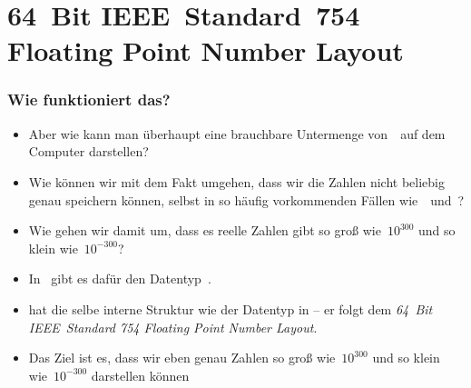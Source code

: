 \documentclass[aspectratio=169,mathserif,notheorems]{beamer}%
\begin{document}
\section{64~Bit IEEE~Standard~754 Floating Point Number Layout}%
%
\begin{frame}%
\frametitle{Wie funktioniert das?}%
\begin{itemize}%
\item Aber wie kann man überhaupt eine brauchbare Untermenge von~\realNumbers\ auf dem Computer darstellen?%
\item<2-> Wie können wir mit dem Fakt umgehen, dass wir die Zahlen nicht beliebig genau speichern können, selbst in so häufig vorkommenden Fällen wie~\numberPi\ und~\numberE?%
\item<3-> Wie gehen wir damit um, dass es reelle Zahlen gibt so groß wie~$10^{300}$ und so klein wie~$10^{-300}$?%
\item<4-> In \python\ gibt es dafür den Datentyp~.%
\item<5->  hat die selbe interne Struktur wie der Datentyp  in \cite{PSF:P3D:TPSL:NTIFC} -- er folgt dem \emph{64~Bit IEEE~Standard 754 Floating Point Number Layout}\cite{IEEE2019ISFFPA,H1997IS7FPN,G1991WECSSKAFPA}.%
\item<6-> Das Ziel ist es, dass wir eben genau Zahlen so groß wie~$10^{300}$ und so klein wie~$10^{-300}$ darstellen können%
\end{itemize}%
\end{frame}%
\end{document}

